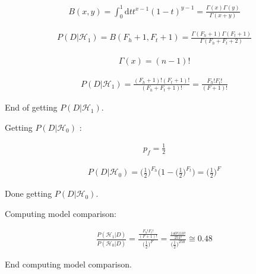 \documentclass{article}
\begin{document}
\begin{gather}
B(x,y) = \int_0^1 \! \mathrm{d}t t^{x-1}(1-t)^{y-1} = \frac{\Gamma(x)\Gamma(y)}{\Gamma(x+y)}
\end{gather}

\begin{gather}
P(D|\mathcal{H}_1) = B(F_h+1,F_t+1) = \frac{\Gamma(F_h+1)\Gamma(F_t+1)}{\Gamma(F_h+F_t+2)}
\end{gather}

\begin{gather}
\Gamma(x) = (n-1)!
\end{gather}

\begin{gather}
P(D|\mathcal{H}_1) = \frac{(F_h+1)!(F_t+1)!}{(F_h+F_t+1)!} = \frac{F_h!F_t!}{(F+1)!}
\end{gather}

End of getting $P(D|\mathcal{H}_1)$.

Getting $P(D|\mathcal{H}_0)$ :

\begin{gather}
p_f = \frac{1}{2}
\end{gather}

\begin{gather}
P(D|\mathcal{H}_0) = \Big(\frac{1}{2}\Big)^{F_h}\Big(1 - \Big(\frac{1}{2}\Big)^{F_t}\Big) = \Big(\frac{1}{2}\Big)^{F}
\end{gather}

Done getting $P(D|\mathcal{H}_0)$.

Computing model comparison:

\begin{gather}
\frac{P(\mathcal{H}_1 | D)}{P(\mathcal{H}_0 | D)} = \frac{\frac{F_h!F_t!}{(F+1)!}}{\Big(\frac{1}{2}\Big)^{F}} =  \frac{\frac{140!110!}{251!}}{\Big(\frac{1}{2}\Big)^{250}} \cong 0.48
\end{gather}

End computing model comparison.
\end{document}
